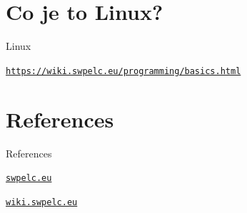 \documentclass{beamer}
\begin{document}
	\section{Co je to Linux?}
	
	\begin{frame}{Linux}

		{\centering \texttt{\href{https://wiki.swpelc.eu/programming/basics.html}{https://wiki.swpelc.eu/programming/basics.html}} \par}		
	\end{frame}

	\section{References}

	\begin{frame}{References}
		{\centering \texttt{\href{https://swpelc.eu}{swpelc.eu}} \par}
		{\centering \texttt{\href{https://wiki.swpelc.eu}{wiki.swpelc.eu}} \par}
	\end{frame}
\end{document}
